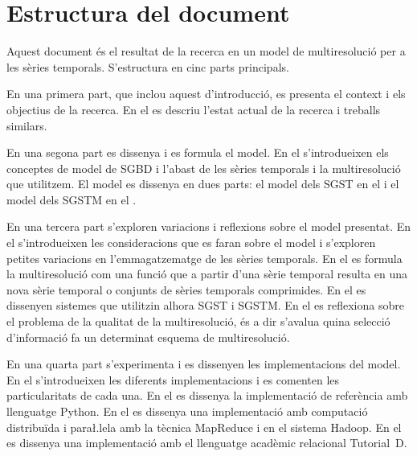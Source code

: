 


\section{Estructura del document}


Aquest document és el resultat de la recerca en un
model de multiresolució per a les sèries temporals. S'estructura en
cinc parts principals.

En una primera part, que inclou aquest 
d'introducció, es presenta el context i els objectius de la
recerca. En el  es descriu l'estat actual de la
recerca i treballs similars.

En una segona part es dissenya i es formula el model.  En el
 s'introdueixen els conceptes de model de
\gls{SGBD} i l'abast de les sèries temporals i la multiresolució que
utilitzem.  El model es dissenya en dues parts: el model dels
\gls{SGST} en el  i el model dels \gls{SGSTM}
en el .


En una tercera part s'exploren variacions i reflexions sobre el model
presentat. En el  s'introdueixen les
consideracions que es faran sobre el model i s'exploren petites
variacions en l'emmagatzematge de les sèries temporals. En el
 es formula la multiresolució com
una funció que a partir d'una sèrie temporal resulta en una nova sèrie
temporal o conjunts de sèries temporals comprimides. En el
 es dissenyen sistemes que utilitzin
alhora \gls{SGST} i \gls{SGSTM}.  En el
 es reflexiona sobre el
problema de la qualitat de la multiresolució, és a dir s'avalua quina
selecció d'informació fa un determinat esquema de multiresolució.



En una quarta part s'experimenta i es dissenyen les implementacions
del model. En el  s'introdueixen les
diferents implementacions i es comenten les particularitats de cada
una. En el  es dissenya la
implementació de referència amb llenguatge Python. En el
 es dissenya una implementació
amb computació distribuïda i para\l.lela amb la tècnica MapReduce i en
el sistema Hadoop. En el  es
dissenya una implementació amb el llenguatge acadèmic relacional
Tutorial~D.


